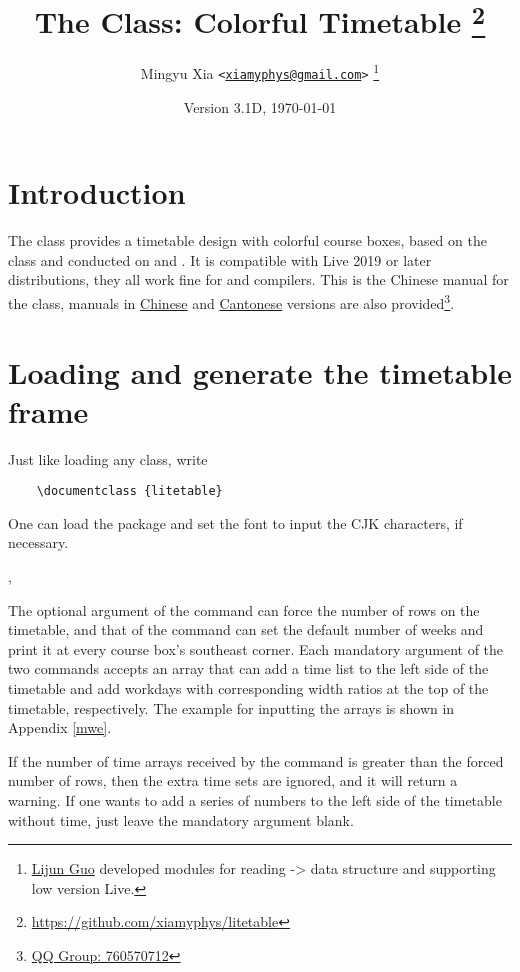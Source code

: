 \documentclass[letterpaper]{l3doc}
\title
{
  \bfseries
  The \cls{litetable} Class: Colorful Timetable
  \thanks{\url{https://github.com/xiamyphys/litetable}}
}
\author
{
  Mingyu Xia \texttt{<\href{mailto:xiamyphys@gmail.com}{xiamyphys@gmail.com}>}
  \thanks{\href{https://github.com/ljguo1020}{Lijun Guo} developed modules for reading \meta{left} -> \meta{right} data structure and supporting low version \hologo {TeX} Live.}
}
\date{Version 3.1D, \today}
\begin{document}
\maketitle

\section{Introduction}

The  class provides a timetable design with colorful course boxes, based on the  class and conducted on  and . It is compatible with Live 2019 or later distributions, they all work fine for  and  compilers. This is the Chinese manual for the  class, manuals in \href{./litetable-cn.pdf}{Chinese} and \href{./litetable-hk.pdf}{Cantonese} versions are also provided\footnote{\href{https://qm.qq.com/q/RyssAhG4qy}{QQ Group: 760570712}}.

\section{Loading  and generate the timetable frame}

Just like loading any class, write

\begin{framed}
  \begin{verbatim}
    \documentclass {litetable}
  \end{verbatim}
\end{framed}

One can load the  package and set the font to input the CJK characters, if necessary.

\begin{function}{\timelist,\weeklist}
  \begin{syntax}
                    
           
  \end{syntax}

  The optional argument of the command  can force the number of rows on the timetable, and that of the command  can set the default number of weeks and print it at every course box's southeast corner. Each mandatory argument of the two commands accepts an array that can add a time list to the left side of the timetable and add workdays with corresponding width ratios at the top of the timetable, respectively. The example for inputting the arrays is shown in Appendix \ref{mwe}.

  If the number of time arrays received by the command  is greater than the forced number of rows, then the extra time sets are ignored, and it will return a warning. If one wants to add a series of numbers to the left side of the timetable without time, just leave the mandatory argument blank.
\end{function}
\end{document}
